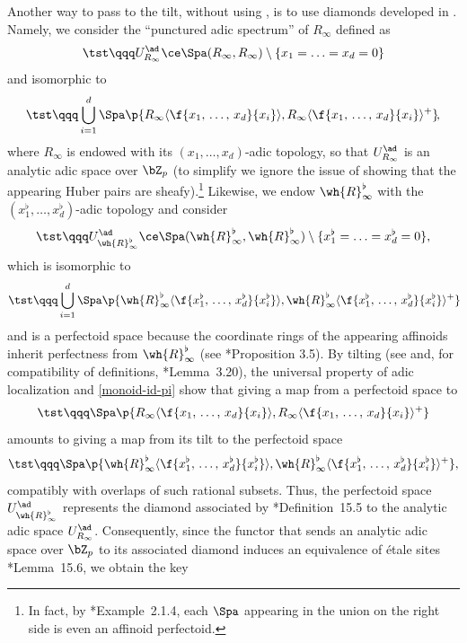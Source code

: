 \remi
Another way to pass to the tilt, without using , is to use diamonds developed in \cite{Sch17}. Namely, we consider the ``punctured adic spectrum'' of $R_\infty$ defined as
\[
\tst \qqq U^\ad_{R_\infty} \ce \Spa(R_\infty, R_\infty) \setminus \{ x_1 = \dotsc = x_d = 0 \}
\]
and isomorphic to
\[
\tst \qqq \bigcup_{i = 1}^{d} \Spa\p{R_\infty\langle\f{x_1,\, \dotsc,\, x_d}{x_i}\rangle, R_\infty\langle\f{x_1,\, \dotsc,\, x_d}{x_i}\rangle^+}\!,
\]
where $R_\infty$ is endowed with its $(x_1, \dotsc, x_d)$-adic topology, so that $U^\ad_{R_\infty}$ is an analytic adic space over $\bZ_p$ (to simplify we ignore the issue of showing that the appearing Huber pairs are sheafy).\footnote{In fact, by \cite{Nak20}*{Example~2.1.4}, each $\Spa$ appearing in the union on the right side is even an affinoid perfectoid.} Likewise, we endow $\wh{R}_\infty^\flat$ with the $(x_1^\flat, \dotsc, x_d^\flat)$-adic topology and consider
\[
\tst\qqq U^\ad_{\wh{R}_\infty^\flat} \ce \Spa(\wh{R}_\infty^\flat, \wh{R}_\infty^\flat) \setminus \{ x_1^\flat = \dotsc = x_d^\flat = 0 \},
\]
which is isomorphic to
\[
\tst \qqq \bigcup_{i = 1}^{d} \Spa\p{\wh{R}_\infty^\flat\langle\f{x_1^\flat,\, \dotsc,\, x_d^\flat}{x_i^\flat}\rangle, \wh{R}_\infty^\flat\langle\f{x_1^\flat,\, \dotsc,\, x_d^\flat}{x_i^\flat}\rangle^+}\!
\]
and is a perfectoid space because the coordinate rings of the appearing affinoids inherit perfectness from $\wh{R}_\infty^\flat$ (see \cite{Sch17}*{Proposition 3.5}). By tilting %
(see  and, for compatibility of definitions, \cite{BMS18}*{Lemma~3.20}), the universal property of adic localization and \eqref{monoid-id-pi} show that giving a map from a perfectoid space to
\[
\tst\qqq \Spa\p{R_\infty\langle\f{x_1,\, \dotsc,\, x_d}{x_i}\rangle, R_\infty\langle\f{x_1,\, \dotsc,\, x_d}{x_i}\rangle^+}
\]
amounts to giving a map from its tilt to the perfectoid space
\[
\tst\qqq\Spa\p{\wh{R}_\infty^\flat\langle\f{x_1^\flat,\, \dotsc,\, x_d^\flat}{x_i^\flat}\rangle, \wh{R}_\infty^\flat\langle\f{x_1^\flat,\, \dotsc,\, x_d^\flat}{x_i^\flat}\rangle^+},
\]
compatibly with overlaps of such rational subsets. Thus, the perfectoid space $U^\ad_{\wh{R}_\infty^\flat}$ represents the diamond associated  by \cite{Sch17}*{Definition~15.5} to the analytic adic space $U^\ad_{R_\infty}$.  Consequently, since the functor that sends an analytic adic space over $\bZ_p$ to its associated diamond induces an equivalence of \'{e}tale sites \cite{Sch17}*{Lemma~15.6}, we obtain the key
